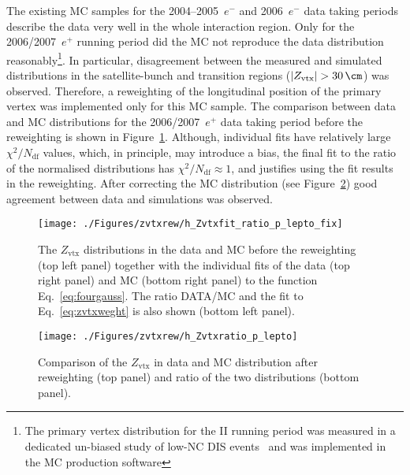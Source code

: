 The existing MC samples for the 2004--2005~$e^-$ and 2006~$e^-$ data taking periods describe the data very well in the whole interaction region. Only for the 2006/2007~$e^+$ running period did the MC not reproduce the data distribution reasonably\footnote{The primary vertex distribution for the \hera II running period was measured in a dedicated un-biased study of low-\qsq NC DIS events~\cite{upub:oliver:zn07008} and was implemented in the MC production software}. In particular, disagreement between the measured and simulated distributions in the satellite-bunch and transition regions ($\left|Z_{\text{vtx}}\right|>30\,\cm$) was observed. Therefore, a reweighting of the longitudinal position of the primary vertex was implemented only for this MC sample. The comparison between data and MC distributions for the 2006/2007~$e^+$ data taking period before the reweighting is shown in Figure~\ref{fig:zvtxrew}. Although, individual fits have relatively large $\chi^2/N_\text{df}$ values, which, in principle, may introduce a bias, the final fit to the ratio of the normalised distributions has $\chi^2/N_\text{df}\approx 1$, and justifies using the fit results in the reweighting. After correcting the MC distribution (see Figure~\ref{fig:zvtxrewaf}) good agreement between data and simulations was observed.
\begin{figure}[t]
\begin{center}
 \hspace{-35pt}\texttt{[image: ./Figures/zvtxrew/h\_Zvtxfit\_ratio\_p\_lepto\_fix]}%
\end{center}
\caption{The $Z_\text{vtx}$ distributions in the data and \lepto MC before the reweighting (top left panel) together with the individual fits of the data (top right panel) and MC (bottom right panel) to the function Eq.~\eqref{eq:fourgauss}. The ratio DATA/MC and the fit to Eq.~\eqref{eq:zvtxweght} is also shown (bottom left panel).} 
\label{fig:zvtxrew}
\end{figure}

\begin{figure}[p]
\begin{center}
 \texttt{[image: ./Figures/zvtxrew/h\_Zvtxratio\_p\_lepto]}
\end{center}
\caption{Comparison of the $Z_\text{vtx}$ in data and \lepto MC distribution after reweighting (top panel) and ratio of the two distributions (bottom panel).} 
\label{fig:zvtxrewaf}
\end{figure}